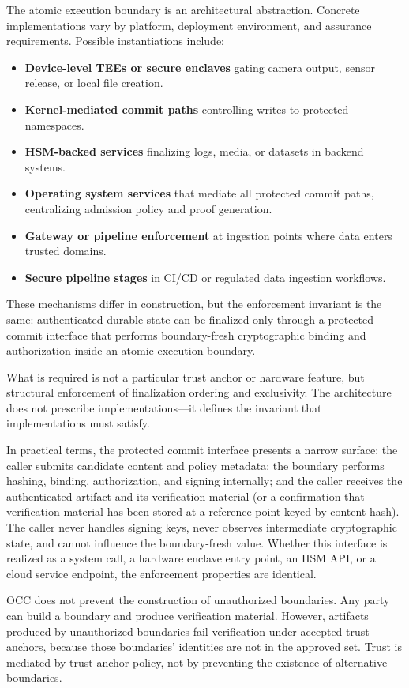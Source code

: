 \documentclass[11pt,letterpaper]{article}
\theoremstyle{occplain}
\theoremstyle{occremark}
\begin{document}
The atomic execution boundary is an architectural abstraction. Concrete implementations vary by platform, deployment environment, and assurance requirements. Possible instantiations include:
\begin{itemize}
  \item \textbf{Device-level TEEs or secure enclaves} gating camera output, sensor release, or local file creation.
  \item \textbf{Kernel-mediated commit paths} controlling writes to protected namespaces.
  \item \textbf{HSM-backed services} finalizing logs, media, or datasets in backend systems.
  \item \textbf{Operating system services} that mediate all protected commit paths, centralizing admission policy and proof generation.
  \item \textbf{Gateway or pipeline enforcement} at ingestion points where data enters trusted domains.
  \item \textbf{Secure pipeline stages} in CI/CD or regulated data ingestion workflows.
\end{itemize}

These mechanisms differ in construction, but the enforcement invariant is the same: authenticated durable state can be finalized only through a protected commit interface that performs boundary-fresh cryptographic binding and authorization inside an atomic execution boundary.

What is required is not a particular trust anchor or hardware feature, but structural enforcement of finalization ordering and exclusivity. The architecture does not prescribe implementations---it defines the invariant that implementations must satisfy.

In practical terms, the protected commit interface presents a narrow surface: the caller submits candidate content and policy metadata; the boundary performs hashing, binding, authorization, and signing internally; and the caller receives the authenticated artifact and its verification material (or a confirmation that verification material has been stored at a reference point keyed by content hash). The caller never handles signing keys, never observes intermediate cryptographic state, and cannot influence the boundary-fresh value. Whether this interface is realized as a system call, a hardware enclave entry point, an HSM API, or a cloud service endpoint, the enforcement properties are identical.

OCC does not prevent the construction of unauthorized boundaries. Any party can build a boundary and produce verification material. However, artifacts produced by unauthorized boundaries fail verification under accepted trust anchors, because those boundaries' identities are not in the approved set. Trust is mediated by trust anchor policy, not by preventing the existence of alternative boundaries.
\end{document}
